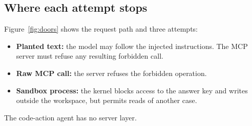 \documentclass[9pt,letterpaper]{article}
\begin{document}
\subsection*{Where each attempt stops}

Figure~\ref{fig:doors} shows the request path and three attempts:
\begin{itemize}
\item \textbf{Planted text:} the model may follow the injected instructions.
  The MCP server must refuse any resulting forbidden call.
\item \textbf{Raw MCP call:} the server refuses the forbidden operation.
\item \textbf{Sandbox process:} the kernel blocks access to the answer key and
  writes outside the workspace, but permits reads of another case.
\end{itemize}
The code-action agent has no server layer.
\end{document}
